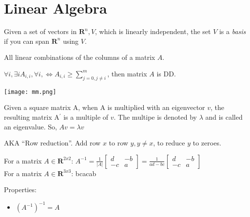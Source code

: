 \section{Linear Algebra}

\begin{definition}[Basis]
    Given a set of vectors in $\mathbf{R}^{n}, V$, which is linearly
    independent, the set $V$ is a \textit{basis} if you can span 
    $\mathbf{R}^{n}$ using $V$.
\end{definition}

\begin{definition}
    All linear combinations of the columns of a matrix $A$.
\end{definition}

\begin{definition}
    $\forall{i}, \exists{i} A_{i, i}, \forall i, \iff A_{i,i} \geq \sum\limits_{j = 0, j\neq i}^{m}$,
    then matrix $A$ is DD.
\end{definition}

\begin{definition}
    \texttt{[image: mm.png]}
\end{definition}

\begin{definition}[Eigenvector]\label{eigen}
    Given a square matrix A, when A is multiplied with an eigenvector $v$,
    the resulting matrix A${^\prime}$ is a multiple of $v$.
    The multipe is denoted by $\lambda$ and is called an eigenvalue.
    So, $Av = \lambda v$

\end{definition}

\begin{definition}
    AKA ``Row reduction''. Add row $x$ to row $y, y \neq x$, to reduce $y$ to 
    zeroes.

\end{definition}

\begin{definition}[Inverse]
    For a matrix $A \in \mathbf{R}^{2x2}$:
    $A^{-1} = \frac{1}{|A|}
        \begin{bmatrix}
            d & -b \\
            -c & a
        \end{bmatrix}
    = \frac{1}{ad - bc}
        \begin{bmatrix}
            d & -b \\
            -c & a
        \end{bmatrix}
    $\\
    For a matrix $A \in \mathbf{R}^{3x3}$: bcacab

    Properties:
    \begin{itemize}
        \item $(A^{-1})^{-1} = A$
    \end{itemize}
\end{definition}


